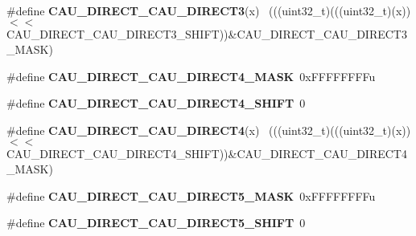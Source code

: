 \begin{DoxyCompactItemize}
\item 
\hypertarget{group___c_a_u___register___masks_ga8abf19bd3e52f104369dd1c26dfd2b05}{}\#define {\bfseries C\+A\+U\+\_\+\+D\+I\+R\+E\+C\+T\+\_\+\+C\+A\+U\+\_\+\+D\+I\+R\+E\+C\+T3}(x)                            ~(((uint32\+\_\+t)(((uint32\+\_\+t)(x))$<$$<$C\+A\+U\+\_\+\+D\+I\+R\+E\+C\+T\+\_\+\+C\+A\+U\+\_\+\+D\+I\+R\+E\+C\+T3\+\_\+\+S\+H\+I\+F\+T))\&C\+A\+U\+\_\+\+D\+I\+R\+E\+C\+T\+\_\+\+C\+A\+U\+\_\+\+D\+I\+R\+E\+C\+T3\+\_\+\+M\+A\+S\+K)\label{group___c_a_u___register___masks_ga8abf19bd3e52f104369dd1c26dfd2b05}

\item 
\hypertarget{group___c_a_u___register___masks_gae8d866b4ec3bf7cad4a7983517e615b7}{}\#define {\bfseries C\+A\+U\+\_\+\+D\+I\+R\+E\+C\+T\+\_\+\+C\+A\+U\+\_\+\+D\+I\+R\+E\+C\+T4\+\_\+\+M\+A\+S\+K}~0x\+F\+F\+F\+F\+F\+F\+F\+Fu\label{group___c_a_u___register___masks_gae8d866b4ec3bf7cad4a7983517e615b7}

\item 
\hypertarget{group___c_a_u___register___masks_ga14860fd31f4e7f9792da121883d992d9}{}\#define {\bfseries C\+A\+U\+\_\+\+D\+I\+R\+E\+C\+T\+\_\+\+C\+A\+U\+\_\+\+D\+I\+R\+E\+C\+T4\+\_\+\+S\+H\+I\+F\+T}~0\label{group___c_a_u___register___masks_ga14860fd31f4e7f9792da121883d992d9}

\item 
\hypertarget{group___c_a_u___register___masks_ga958f9f6a20cb8ef3ad8cb17898690f01}{}\#define {\bfseries C\+A\+U\+\_\+\+D\+I\+R\+E\+C\+T\+\_\+\+C\+A\+U\+\_\+\+D\+I\+R\+E\+C\+T4}(x)                            ~(((uint32\+\_\+t)(((uint32\+\_\+t)(x))$<$$<$C\+A\+U\+\_\+\+D\+I\+R\+E\+C\+T\+\_\+\+C\+A\+U\+\_\+\+D\+I\+R\+E\+C\+T4\+\_\+\+S\+H\+I\+F\+T))\&C\+A\+U\+\_\+\+D\+I\+R\+E\+C\+T\+\_\+\+C\+A\+U\+\_\+\+D\+I\+R\+E\+C\+T4\+\_\+\+M\+A\+S\+K)\label{group___c_a_u___register___masks_ga958f9f6a20cb8ef3ad8cb17898690f01}

\item 
\hypertarget{group___c_a_u___register___masks_gaa8212c898d5d71af9b7003bcc5c68a58}{}\#define {\bfseries C\+A\+U\+\_\+\+D\+I\+R\+E\+C\+T\+\_\+\+C\+A\+U\+\_\+\+D\+I\+R\+E\+C\+T5\+\_\+\+M\+A\+S\+K}~0x\+F\+F\+F\+F\+F\+F\+F\+Fu\label{group___c_a_u___register___masks_gaa8212c898d5d71af9b7003bcc5c68a58}

\item 
\hypertarget{group___c_a_u___register___masks_ga7f59928c2b946e1d249aa9b3b3fdd537}{}\#define {\bfseries C\+A\+U\+\_\+\+D\+I\+R\+E\+C\+T\+\_\+\+C\+A\+U\+\_\+\+D\+I\+R\+E\+C\+T5\+\_\+\+S\+H\+I\+F\+T}~0\label{group___c_a_u___register___masks_ga7f59928c2b946e1d249aa9b3b3fdd537}


\end{DoxyCompactItemize}
